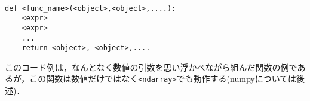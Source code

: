 \begin{gram}[関数の定義]　
\begin{lstlisting}
def <func_name>(<object>,<object>,....):
	<expr>
	<expr>
	...
	return <object>, <object>,....
\end{lstlisting}
\end{gram}

このコード例は，なんとなく数値の引数を思い浮かべながら組んだ関数の例であるが，この関数は数値だけではなく\texttt{<ndarray>}でも動作する(numpyについては後述)．
\begin{cod}[\texttt{py5.py}]　
}]{code/py5.py}
\vspace{-7pt}
\begin{lstlisting}
add=9,sub=11,mul=-10,div=-10.0
tpl=(0, 10, -25, -1.0)

add=[0 0 0],sub=[2 4 6],mul=[-1 -4 -9],div=[-1. -1. -1.]
\end{lstlisting}
\end{cod}
\vspace{-10pt}

















